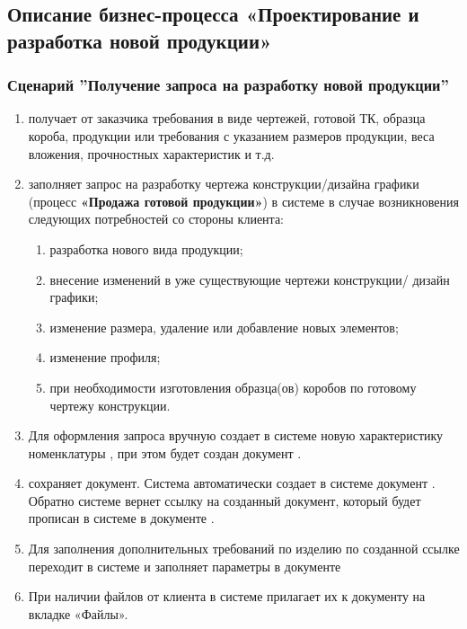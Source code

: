 
\subsection{Описание бизнес-процесса «Проектирование и разработка новой продукции»}

\subsubsection{Сценарий ''Получение запроса на разработку новой продукции''}
\label{bp:pm_1}

\begin{enumerate}

\item \manager получает от заказчика требования в виде чертежей, готовой ТК, образца короба, продукции или требования с указанием размеров продукции, веса вложения, прочностных характеристик и т.д.
\item \manager заполняет запрос на разработку чертежа конструкции/дизайна графики (процесс \textbf{«Продажа готовой продукции»}) в системе \erp в случае возникновения следующих потребностей со стороны клиента:
    
    \begin{enumerate}
        \item разработка нового вида продукции;
        \item внесение изменений в уже существующие чертежи конструкции/ дизайн графики;
\item изменение размера, удаление или добавление новых элементов;
\item изменение профиля;
\item при необходимости изготовления образца(ов) коробов по готовому чертежу конструкции.
    \end{enumerate}


\item	Для оформления запроса \manager вручную создает в системе \erp новую характеристику номенклатуры , при этом будет создан документ .
\item \manager сохраняет документ. Система \erp автоматически создает в системе \gofro документ .
Обратно системе \gofro вернет ссылку на созданный документ, который будет прописан в системе \erp в документе .

\item Для заполнения дополнительных требований по изделию \manager по созданной ссылке переходит в системе \gofro и заполняет параметры в документе 
\item	При наличии файлов от клиента \manager в системе \gofro прилагает их к документу  на вкладке «Файлы».



\end{enumerate}
